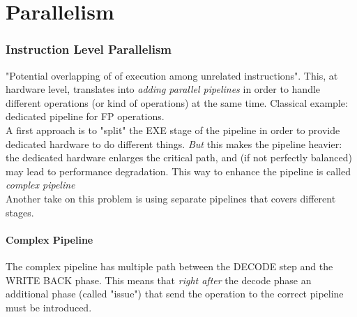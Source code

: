 \documentclass[10pt,a4paper]{article}
\begin{document}
	\part{Parallelism}
		\section{Instruction Level Parallelism}
			"Potential overlapping of of execution among unrelated instructions". This, at hardware level, translates into \emph{adding parallel pipelines} in order to handle different operations (or kind of operations) at the same time. Classical example: dedicated pipeline for FP operations.\\
			A first approach is to "split" the EXE stage of the pipeline in order to provide dedicated hardware to do different things. \emph{But} this makes the pipeline heavier: the dedicated hardware enlarges the critical path, and (if not perfectly balanced) may lead to performance degradation. This way to enhance the pipeline is called \emph{complex pipeline}\\
			Another take on this problem is using separate pipelines that covers different stages. 
			
			\subsection{Complex Pipeline}
				The complex pipeline has multiple path between the DECODE step and the WRITE BACK phase. This means that \emph{right after} the decode phase an additional phase (called "issue") that send the operation to the correct pipeline must be introduced. 
\end{document}
